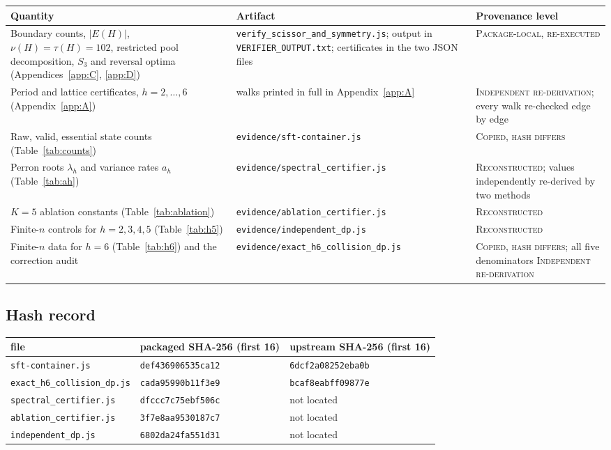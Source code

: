 \begin{center}
\begin{tabular}{p{}p{}p{}}
\toprule
Quantity & Artifact & Provenance level \\
\midrule
Boundary counts, \(|E(H)|\), \(\nu(H)=\tau(H)=102\), restricted pool
decomposition, \(S_3\) and reversal optima (Appendices~\ref{app:C},
\ref{app:D})
& \texttt{verify\_scissor\_and\_symmetry.js}; output in
\texttt{VERIFIER\_OUTPUT.txt}; certificates in the two JSON files
& \textsc{Package-local, re-executed} \\
\addlinespace
Period and lattice certificates, \(h=2,\ldots,6\) (Appendix~\ref{app:A})
& walks printed in full in Appendix~\ref{app:A}
& \textsc{Independent re-derivation}; every walk re-checked edge by edge \\
\addlinespace
Raw, valid, essential state counts (Table~\ref{tab:counts})
& \texttt{evidence/sft-container.js}
& \textsc{Copied, hash differs} \\
\addlinespace
Perron roots \(\lambda_h\) and variance rates \(a_h\) (Table~\ref{tab:ah})
& \texttt{evidence/spectral\_certifier.js}
& \textsc{Reconstructed}; values independently re-derived by two methods \\
\addlinespace
\(K=5\) ablation constants (Table~\ref{tab:ablation})
& \texttt{evidence/ablation\_certifier.js}
& \textsc{Reconstructed} \\
\addlinespace
Finite-\(n\) controls for \(h=2,3,4,5\) (Table~\ref{tab:h5})
& \texttt{evidence/independent\_dp.js}
& \textsc{Reconstructed} \\
\addlinespace
Finite-\(n\) data for \(h=6\) (Table~\ref{tab:h6}) and the correction audit
& \texttt{evidence/exact\_h6\_collision\_dp.js}
& \textsc{Copied, hash differs}; all five denominators
\textsc{Independent re-derivation} \\
\bottomrule
\end{tabular}
\end{center}

\subsection*{Hash record}

\begin{center}
\begin{tabular}{lll}
\toprule
file & packaged SHA-256 (first 16) & upstream SHA-256 (first 16) \\
\midrule
\texttt{sft-container.js} & \texttt{def436906535ca12} & \texttt{6dcf2a08252eba0b} \\
\texttt{exact\_h6\_collision\_dp.js} & \texttt{cada95990b11f3e9} & \texttt{bcaf8eabff09877e} \\
\texttt{spectral\_certifier.js} & \texttt{dfccc7c75ebf506c} & not located \\
\texttt{ablation\_certifier.js} & \texttt{3f7e8aa9530187c7} & not located \\
\texttt{independent\_dp.js} & \texttt{6802da24fa551d31} & not located \\
\bottomrule
\end{tabular}
\end{center}

